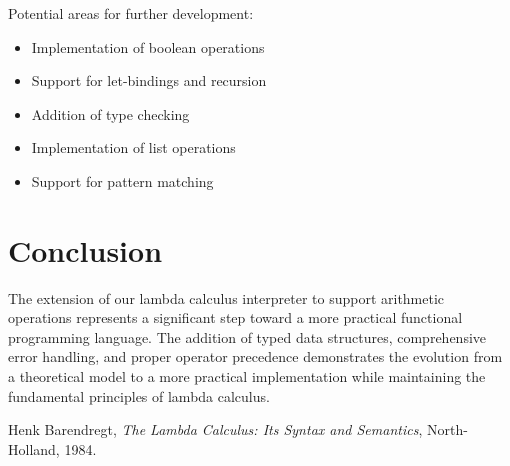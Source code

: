 Potential areas for further development:

\begin{itemize}
    \item Implementation of boolean operations
    \item Support for let-bindings and recursion
    \item Addition of type checking
    \item Implementation of list operations
    \item Support for pattern matching
\end{itemize}

\section{Conclusion}

The extension of our lambda calculus interpreter to support arithmetic operations represents a significant step toward a more practical functional programming language. The addition of typed data structures, comprehensive error handling, and proper operator precedence demonstrates the evolution from a theoretical model to a more practical implementation while maintaining the fundamental principles of lambda calculus.

\begin{thebibliography}{9}
 Henk Barendregt, \emph{The Lambda Calculus: Its Syntax and Semantics}, North-Holland, 1984.
\end{thebibliography}


